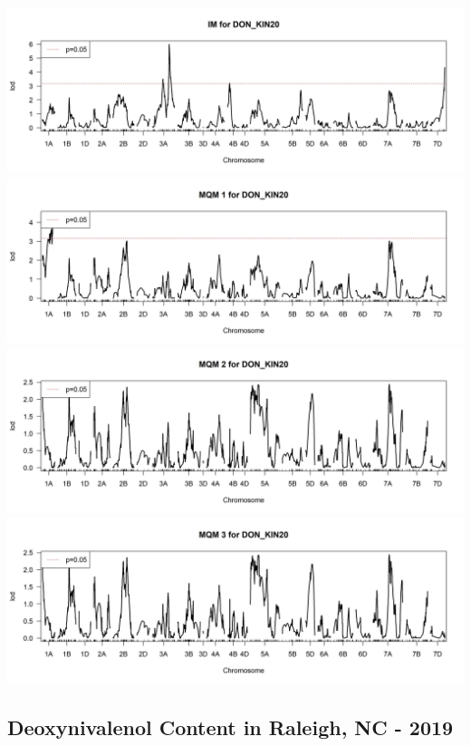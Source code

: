 \documentclass[
]{article}
\begin{document}
\includegraphics{Scan_IM_DON_KIN20.jpg}
\includegraphics{Scan_MQM1_DON_KIN20.jpg}
\includegraphics{Scan_MQM2_DON_KIN20.jpg}
\includegraphics{Scan_MQM3_DON_KIN20.jpg} \pagebreak

\subsection{Deoxynivalenol Content in Raleigh, NC -
2019}\label{deoxynivalenol-content-in-raleigh-nc---2019}
\end{document}
